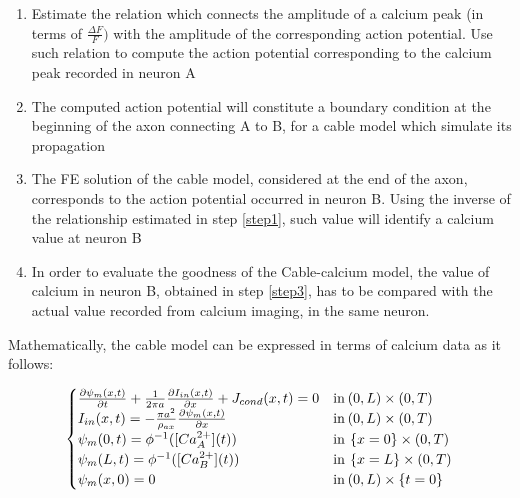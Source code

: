 \documentclass[12pt, a4paper]{report}
\begin{document}
\begin{enumerate}
	
	\item Estimate the relation which connects the amplitude of a calcium peak (in terms of $\frac{\Delta F}{F})$ with the amplitude of the corresponding action potential. Use such relation to compute the action potential corresponding to the calcium peak recorded in neuron A \label{step1}
	
	\item The computed action potential will constitute a boundary condition at the beginning of the axon connecting A to B, for a cable model which simulate its propagation 
	
	\item The FE solution of the cable model, considered at the end of the axon, corresponds to the action potential occurred in neuron B. Using the inverse of the relationship estimated in step \ref{step1}, such value will identify a calcium value at neuron B \label{step3}
	
	\item In order to evaluate the goodness of the Cable-calcium model, the value of calcium in neuron B, obtained in step \ref{step3},  has to be compared with the actual value recorded from calcium imaging, in the same neuron.
	
\end{enumerate}


Mathematically, the cable model can be expressed in terms of calcium data as it follows:

\begin{equation}
	\begin{cases} 
	\frac{\partial \psi_m(x,t)}{\partial t} + \frac{1}{2 \pi a }\frac{\partial I_{in}(x,t)}{\partial x} + J_{cond}(x,t) = 0 & \text{in} \hspace{0.07 cm} (0,L) \times (0,T) \\ 
	I_{in}(x,t) = -\frac{\pi a^2}{\rho_{ax}}\frac{\partial \psi_m(x,t)}{\partial x} & \text{in} \hspace{0.07 cm} (0,L) \times (0,T) \\
	\psi_m(0,t) = \phi^{-1}([Ca_A^{2+}](t)) & \text{in} \hspace{0.07 cm} \left\{ x = 0\right\} \times (0,T) \\
	\psi_m(L,t) = \phi^{-1}([Ca_B^{2+}](t)) & \text{in} \hspace{0.07 cm} \left\{ x = L\right\} \times (0,T) \\
	\psi_m(x,0)=0  & \text{in} \hspace{0.07 cm}  (0,L) \times \left\{ t = 0\right\}
	\end{cases} \label{cable with ca}
\end{equation}	
\end{document}
